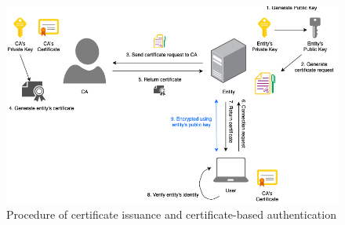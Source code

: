 \begin{figure}[hbt]
\centering
  \includegraphics[width=14cm]{figures/pki.png}
  \caption{Procedure of certificate issuance and certificate-based authentication}
  \label{fig:pki}
\end{figure}